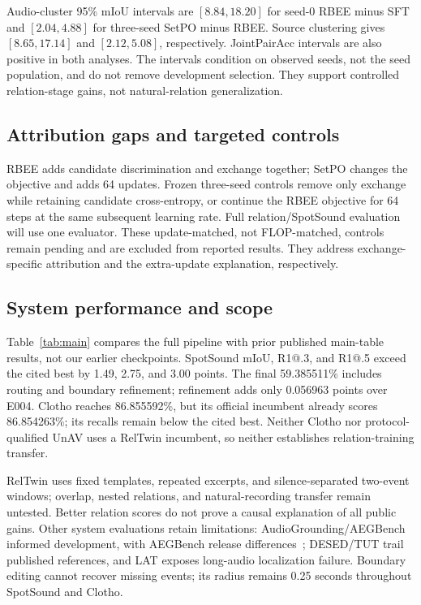 Audio-cluster 95\% mIoU intervals are $[8.84,18.20]$ for seed-0 RBEE minus SFT and $[2.04,4.88]$ for three-seed SetPO minus RBEE. Source clustering gives $[8.65,17.14]$ and $[2.12,5.08]$, respectively. JointPairAcc intervals are also positive in both analyses. The intervals condition on observed seeds, not the seed population, and do not remove development selection. They support controlled relation-stage gains, not natural-relation generalization.

\subsection{Attribution gaps and targeted controls}
RBEE adds candidate discrimination and exchange together; SetPO changes the objective and adds 64 updates. Frozen three-seed controls remove only exchange while retaining candidate cross-entropy, or continue the RBEE objective for 64 steps at the same subsequent learning rate. Full relation/SpotSound evaluation will use one evaluator. These update-matched, not FLOP-matched, controls remain pending and are excluded from reported results. They address exchange-specific attribution and the extra-update explanation, respectively.

\subsection{System performance and scope}
Table~\ref{tab:main} compares the full pipeline with prior published main-table results, not our earlier checkpoints. SpotSound mIoU, R1@.3, and R1@.5 exceed the cited best by 1.49, 2.75, and 3.00 points. The final 59.385511\% includes routing and boundary refinement; refinement adds only 0.056963 points over E004. Clotho reaches 86.855592\%, but its official incumbent already scores 86.854263\%; its recalls remain below the cited best. Neither Clotho nor protocol-qualified UnAV uses a RelTwin incumbent, so neither establishes relation-training transfer.

RelTwin uses fixed templates, repeated excerpts, and silence-separated two-event windows; overlap, nested relations, and natural-recording transfer remain untested. Better relation scores do not prove a causal explanation of all public gains. Other system evaluations retain limitations: AudioGrounding/AEGBench informed development, with AEGBench release differences~\cite{zhang2026autoaeg}; DESED/TUT trail published references, and LAT exposes long-audio localization failure. Boundary editing cannot recover missing events; its radius remains 0.25 seconds throughout SpotSound and Clotho.
